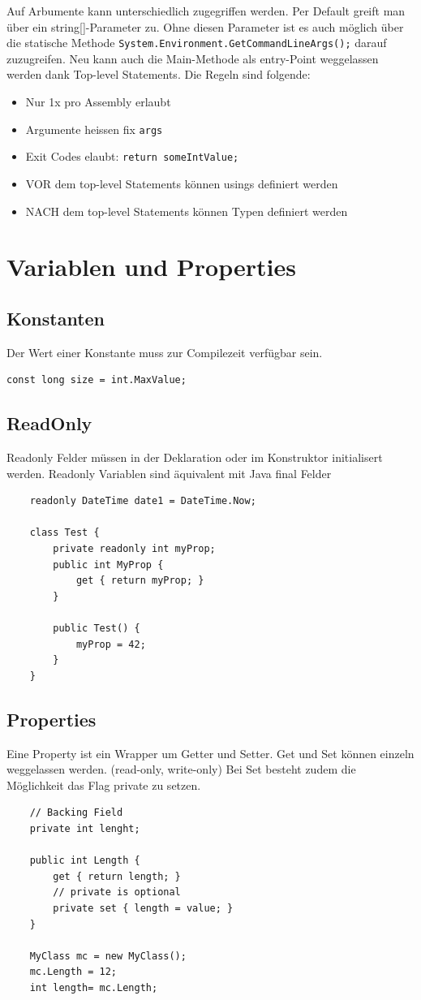 \documentclass[
a4paper,
oneside,
10pt,
fleqn,
headsepline,
toc=listofnumbered, 
bibliography=totocnumbered]{scrartcl}
\let\stdsection\section
\renewcommand\section{\clearpage\stdsection}
\begin{document}
Auf Arbumente kann unterschiedlich zugegriffen werden. Per Default greift man über ein string[]-Parameter zu. Ohne diesen Parameter ist es auch möglich über die statische Methode \lstinline|System.Environment.GetCommandLineArgs();| darauf zuzugreifen. Neu kann auch die Main-Methode als entry-Point weggelassen werden dank Top-level Statements. Die Regeln sind folgende:
\begin{itemize}
	\item Nur 1x pro Assembly erlaubt
	\item Argumente heissen fix \lstinline|args|
	\item Exit Codes elaubt: \lstinline|return someIntValue;|
	\item VOR dem top-level Statements können usings definiert werden
	\item NACH dem top-level Statements können Typen definiert werden
\end{itemize}

\section{Variablen und Properties}
\subsection{Konstanten}
Der Wert einer Konstante muss zur Compilezeit verfügbar sein.
\begin{lstlisting}
const long size = int.MaxValue;
\end{lstlisting}

\subsection{ReadOnly}
Readonly Felder müssen in der Deklaration oder im Konstruktor initialisert werden. Readonly Variablen sind äquivalent mit Java final Felder
\begin{lstlisting}
	readonly DateTime date1 = DateTime.Now;
	
	class Test {
		private readonly int myProp;
		public int MyProp {
			get { return myProp; }
		}
		
		public Test() {
			myProp = 42;
		}
	}
\end{lstlisting}

\subsection{Properties}
Eine Property ist ein Wrapper um Getter und Setter. Get und Set können einzeln weggelassen werden. (read-only, write-only) Bei Set besteht zudem die Möglichkeit das Flag private zu setzen.
\begin{lstlisting}
	// Backing Field
	private int lenght;
	
	public int Length {
		get { return length; }
		// private is optional
		private set { length = value; } 
	}
	
	MyClass mc = new MyClass();
	mc.Length = 12;
	int length= mc.Length;
	
\end{lstlisting}
\end{document}
